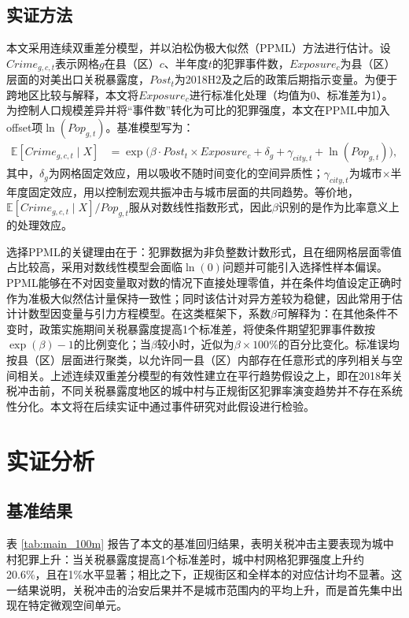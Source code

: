 \documentclass[a4paper,12pt]{report}
\begin{document}
\section{实证方法}
\label{sec:method_ppml}
本文采用连续双重差分模型，并以泊松伪极大似然（PPML）方法进行估计。设$Crime_{g,c,t}$表示网格$g$在县（区）$c$、半年度$t$的犯罪事件数，$Exposure_c$为县（区）层面的对美出口关税暴露度，$Post_t$为2018H2及之后的政策后期指示变量。为便于跨地区比较与解释，本文将$Exposure_c$进行标准化处理（均值为0、标准差为1）。为控制人口规模差异并将“事件数”转化为可比的犯罪强度，本文在PPML中加入offset项$\ln(Pop_{g,t})$。基准模型写为：
\begin{equation}
\begin{split}
\mathbb{E}\left[Crime_{g,c,t}\mid X\right]
&=\exp\Big(\beta\cdot Post_t\times Exposure_c+\delta_g+\gamma_{city,t}+\ln(Pop_{g,t})\Big),
\end{split}
\end{equation}
其中，$\delta_g$为网格固定效应，用以吸收不随时间变化的空间异质性；$\gamma_{city,t}$为城市$\times$半年度固定效应，用以控制宏观共振冲击与城市层面的共同趋势。等价地，$\mathbb{E}[Crime_{g,c,t}\mid X]/Pop_{g,t}$服从对数线性指数形式，因此$\beta$识别的是作为比率意义上的处理效应。

选择PPML的关键理由在于：犯罪数据为非负整数计数形式，且在细网格层面零值占比较高，采用对数线性模型会面临$\ln(0)$问题并可能引入选择性样本偏误。PPML能够在不对因变量取对数的情况下直接处理零值，并在条件均值设定正确时作为准极大似然估计量保持一致性；同时该估计对异方差较为稳健，因此常用于估计计数型因变量与引力方程模型\citep{santosSilva2006ppml}。在这类框架下，系数$\beta$可解释为：在其他条件不变时，政策实施期间关税暴露度提高1个标准差，将使条件期望犯罪事件数按$\exp(\beta)-1$的比例变化；当$\beta$较小时，近似为$\beta\times100\%$的百分比变化。标准误均按县（区）层面进行聚类，以允许同一县（区）内部存在任意形式的序列相关与空间相关。上述连续双重差分模型的有效性建立在平行趋势假设之上，即在2018年关税冲击前，不同关税暴露度地区的城中村与正规街区犯罪率演变趋势并不存在系统性分化。本文将在后续实证中通过事件研究对此假设进行检验。

\chapter{实证分析}

\section{基准结果}
表 \ref{tab:main_100m} 报告了本文的基准回归结果，表明关税冲击主要表现为城中村犯罪上升：当关税暴露度提高1个标准差时，城中村网格犯罪强度上升约20.6\%，且在1\%水平显著；相比之下，正规街区和全样本的对应估计均不显著。这一结果说明，关税冲击的治安后果并不是城市范围内的平均上升，而是首先集中出现在特定微观空间单元。
\end{document}
